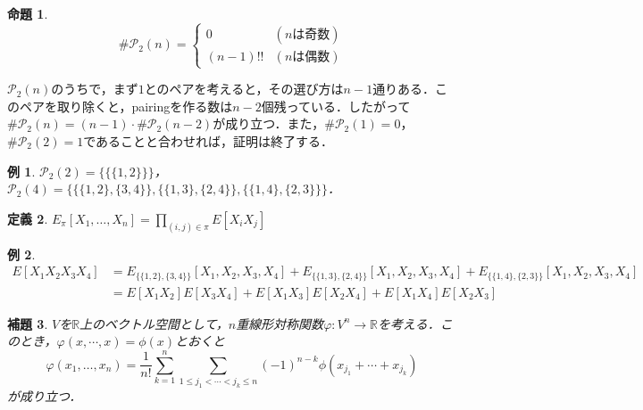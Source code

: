 \documentclass{ltjsarticle}
\makeatletter
\theoremstyle{mystyle1}
\newtheorem{dfn}{定義}[section]
\newtheorem{prop}[dfn]{命題}
\newtheorem{lem}[dfn]{補題}
\theoremstyle{mystyle2}
\newtheorem{example}{例}
\theoremstyle{mystyle3}
\renewenvironment{proof}[1][\proofname]{\par
  \pushQED{\qed}%
  \normalfont
  \topsep6\p@\@plus6\p@ \trivlist
  \item[\hskip\labelsep{\bfseries\sffamily #1}]\ignorespaces
}{%
  \popQED\endtrivlist\@endpefalse
}
\renewcommand\proofname{証明}
\makeatother
\begin{document}
\begin{prop}
    \begin{equation}
        \#\mathcal{P}_2(n)=\begin{cases}
            0       & (nは奇数) \\
            (n-1)!! & (nは偶数)
        \end{cases}
    \end{equation}
\end{prop}

\begin{proof}
    $\mathcal{P}_2(n)$のうちで，まず$1$とのペアを考えると，その選び方は$n-1$通りある．このペアを取り除くと，pairingを作る数は$n-2$個残っている．したがって$\#\mathcal{P}_2(n)=(n-1)\cdot\#\mathcal{P}_2(n-2)$が成り立つ．また，$\#\mathcal{P}_2(1)=0$，$\#\mathcal{P}_2(2)=1$であることと合わせれば，証明は終了する．
\end{proof}

\begin{example}
    $\mathcal{P}_2(2)=\{\{\{1,2\}\}\}$，$\mathcal{P}_2(4)=\{\{\{1,2\},\{3,4\}\},\{\{1,3\},\{2,4\}\},\{\{1,4\},\{2,3\}\}\}$．
\end{example}

\begin{dfn}
    $E_\pi [X_1,\ldots,X_n]=\prod_{(i,j)\in\pi}E[X_iX_j]$
\end{dfn}

\begin{example}
    \begin{equation}
        \begin{split}
            E[X_1X_2X_3X_4]&=E_{\{\{1,2\},\{3,4\}\}}[X_1,X_2,X_3,X_4]+E_{\{\{1,3\},\{2,4\}\}}[X_1,X_2,X_3,X_4]+E_{\{\{1,4\},\{2,3\}\}}[X_1,X_2,X_3,X_4] \\
            &=E[X_1X_2]E[X_3X_4]+E[X_1X_3]E[X_2X_4]+E[X_1X_4]E[X_2X_3]
        \end{split}
    \end{equation}
\end{example}

\begin{lem}
    $V$を$\mathbb{R}$上のベクトル空間として，$n$重線形対称関数$\varphi:V^n\to\mathbb{R}$を考える．このとき，$\varphi(x,\cdots,x)=\phi(x)$とおくと
    \begin{equation}
        \varphi(x_1,\ldots,x_n)=\frac{1}{n!}\sum_{k=1}^n\sum_{1\leq j_1<\cdots<j_k\leq n}(-1)^{n-k}\phi(x_{j_1}+\cdots+x_{j_k})
    \end{equation}
    が成り立つ．
\end{lem}
\end{document}
